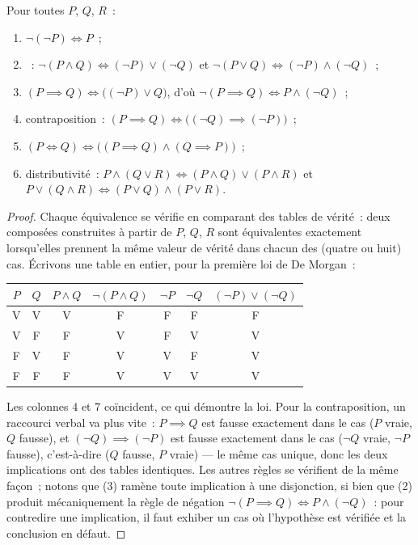 \begin{proposition}\label{prop:b1:logic:rules}
Pour toutes  $P$, $Q$, $R$~:
\begin{enumerate}
  \item $\lnot(\lnot P) \iff P$~;
  \item {}~:
        $\lnot(P \land Q) \iff (\lnot P) \lor (\lnot Q)$ et
        $\lnot(P \lor Q) \iff (\lnot P) \land (\lnot Q)$~;
  \item $(P \implies Q) \iff \bigl((\lnot P) \lor Q\bigr)$, d'où
        $\lnot(P \implies Q) \iff P \land (\lnot Q)$~;
  \item contraposition~:
        $(P \implies Q) \iff \bigl((\lnot Q) \implies (\lnot P)\bigr)$~;
  \item $(P \iff Q) \iff \bigl((P \implies Q) \land (Q \implies
        P)\bigr)$~;
  \item distributivité~: $P \land (Q \lor R) \iff (P \land Q) \lor
        (P \land R)$ et $P \lor (Q \land R) \iff (P \lor Q) \land
        (P \lor R)$.
\end{enumerate}
\end{proposition}

\begin{proof}
Chaque équivalence se vérifie en comparant des tables de vérité~: deux
 composées construites à partir de $P$, $Q$, $R$ sont
équivalentes exactement lorsqu'elles prennent la même valeur de vérité
dans chacun des (quatre ou huit) cas. Écrivons une table en entier,
pour la première loi de De Morgan~:
\begin{center}
\begin{tabular}{cc|c|c|cc|c}
$P$ & $Q$ & $P \land Q$ & $\lnot(P \land Q)$ & $\lnot P$ & $\lnot Q$ &
$(\lnot P) \lor (\lnot Q)$ \\
\hline
V & V & V & F & F & F & F \\
V & F & F & V & F & V & V \\
F & V & F & V & V & F & V \\
F & F & F & V & V & V & V \\
\end{tabular}
\end{center}
Les colonnes $4$ et $7$ coïncident, ce qui démontre la loi. Pour la
contraposition, un raccourci verbal va plus vite~: $P \implies Q$ est
fausse exactement dans le cas ($P$ vraie, $Q$ fausse), et
$(\lnot Q) \implies (\lnot P)$ est fausse exactement dans le cas
($\lnot Q$ vraie, $\lnot P$ fausse), c'est-à-dire ($Q$ fausse, $P$
vraie) --- le même cas unique, donc les deux implications ont des tables
identiques. Les autres règles se vérifient de la même façon~; notons que
(3) ramène toute implication à une disjonction, si bien que (2) produit
mécaniquement la règle de négation $\lnot(P \implies Q) \iff P
\land (\lnot Q)$~: pour contredire une implication, il faut exhiber un
cas où l'hypothèse est vérifiée et la conclusion en défaut.
\end{proof}

